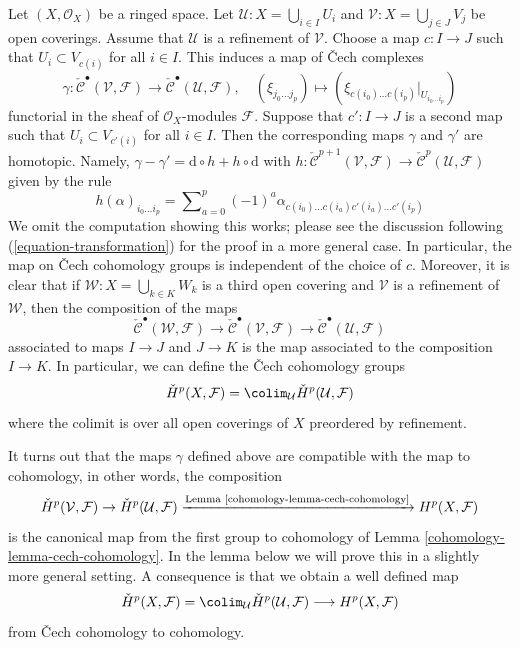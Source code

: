 Let $(X, \mathcal{O}_X)$ be a ringed space. Let
$\mathcal{U} : X = \bigcup_{i \in I} U_i$ and
$\mathcal{V} : X = \bigcup_{j \in J} V_j$ be open coverings.
Assume that $\mathcal{U}$ is a refinement of $\mathcal{V}$.
Choose a map $c : I \to J$ such that $U_i \subset V_{c(i)}$
for all $i \in I$. This induces a map of {\v C}ech complexes
$$
\gamma :
\check{\mathcal{C}}^\bullet(\mathcal{V}, \mathcal{F})
\longrightarrow
\check{\mathcal{C}}^\bullet(\mathcal{U}, \mathcal{F}),
\quad
(\xi_{j_0 \ldots j_p})
\longmapsto
(\xi_{c(i_0) \ldots c(i_p)}|_{U_{i_0 \ldots i_p}})
$$
functorial in the sheaf of $\mathcal{O}_X$-modules $\mathcal{F}$.
Suppose that $c' : I \to J$ is a second map such that
$U_i \subset V_{c'(i)}$ for all $i \in I$. Then the corresponding maps
$\gamma$ and $\gamma'$ are homotopic. Namely,
$\gamma - \gamma' = \text{d} \circ h + h \circ \text{d}$
with
$h : \check{\mathcal{C}}^{p + 1}(\mathcal{V}, \mathcal{F}) \to
\check{\mathcal{C}}^p(\mathcal{U}, \mathcal{F})$
given by the rule
$$
h(\alpha)_{i_0 \ldots i_p} =
\sum\nolimits_{a = 0}^{p}
(-1)^a
\alpha_{c(i_0)\ldots c(i_a) c'(i_a) \ldots c'(i_p)}
$$
We omit the computation showing this works; please see the discussion
following (\ref{equation-transformation}) for the proof in a more general
case. In particular, the map on {\v C}ech cohomology groups is independent
of the choice of $c$. Moreover, it is clear that if
$\mathcal{W} : X = \bigcup_{k \in K} W_k$ is a third open covering
and $\mathcal{V}$ is a refinement of $\mathcal{W}$, then the composition
of the maps
$$
\check{\mathcal{C}}^\bullet(\mathcal{W}, \mathcal{F})
\longrightarrow
\check{\mathcal{C}}^\bullet(\mathcal{V}, \mathcal{F})
\longrightarrow
\check{\mathcal{C}}^\bullet(\mathcal{U}, \mathcal{F})
$$
associated to maps $I \to J$ and $J \to K$ is the map associated
to the composition $I \to K$.
In particular, we can define the {\v C}ech cohomology
groups
$$
\check{H}^p(X, \mathcal{F}) =
\colim_\mathcal{U} \check{H}^p(\mathcal{U}, \mathcal{F})
$$
where the colimit is over all open coverings of $X$ preordered by refinement.

\medskip\noindent
It turns out that the maps $\gamma$ defined above are compatible with
the map to cohomology, in other words, the composition
$$
\check{H}^p(\mathcal{V}, \mathcal{F}) \to
\check{H}^p(\mathcal{U}, \mathcal{F})
\xrightarrow{\text{Lemma \ref{cohomology-lemma-cech-cohomology}}}
H^p(X, \mathcal{F})
$$
is the canonical map from the first group to cohomology of
Lemma \ref{cohomology-lemma-cech-cohomology}.
In the lemma below we will prove this in a slightly more general
setting. A consequence is that we obtain a well defined map
\begin{equation}
\label{equation-cech-to-cohomology}
\check{H}^p(X, \mathcal{F}) =
\colim_\mathcal{U} \check{H}^p(\mathcal{U}, \mathcal{F})
\longrightarrow
H^p(X, \mathcal{F})
\end{equation}
from {\v C}ech cohomology to cohomology.

